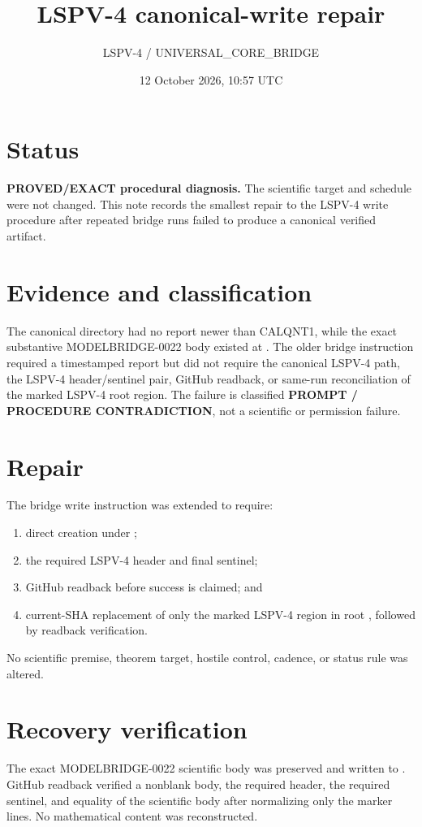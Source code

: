 \documentclass[11pt]{article}
\title{LSPV-4 canonical-write repair}
\author{LSPV-4 / UNIVERSAL\_CORE\_BRIDGE}
\date{12 October 2026, 10:57 UTC}
\begin{document}
\maketitle

\section*{Status}
\textbf{PROVED/EXACT procedural diagnosis.}  The scientific target and
schedule were not changed.  This note records the smallest repair to the
LSPV-4 write procedure after repeated bridge runs failed to produce a
canonical verified artifact.

\section*{Evidence and classification}
The canonical directory  had no report newer
than CALQNT1, while the exact substantive MODELBRIDGE-0022 body existed at
.
The older bridge instruction required a timestamped report but did not require
the canonical LSPV-4 path, the LSPV-4 header/sentinel pair, GitHub readback,
or same-run reconciliation of the marked LSPV-4 root region.  The failure is
classified \textbf{PROMPT / PROCEDURE CONTRADICTION}, not a scientific or
permission failure.

\section*{Repair}
The bridge write instruction was extended to require:
\begin{enumerate}
\item direct creation under ;
\item the required LSPV-4 header and final sentinel;
\item GitHub readback before success is claimed; and
\item current-SHA replacement of only the marked LSPV-4 region in root
, followed by readback verification.
\end{enumerate}
No scientific premise, theorem target, hostile control, cadence, or status
rule was altered.

\section*{Recovery verification}
The exact MODELBRIDGE-0022 scientific body was preserved and written to
.
GitHub readback verified a nonblank body, the required header, the required
sentinel, and equality of the scientific body after normalizing only the
marker lines.  No mathematical content was reconstructed.
\end{document}
